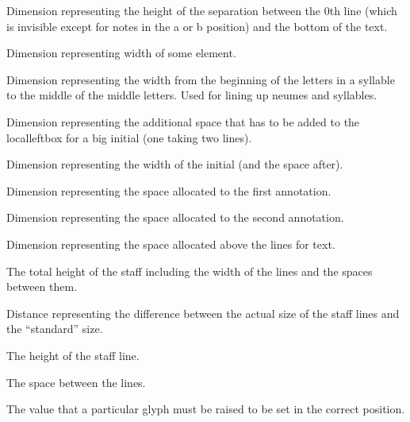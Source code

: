 Dimension representing the height of the separation between the 0th
line (which is invisible except for notes in the a or b position) and
the bottom of the text.

Dimension representing width of some element.

Dimension representing the width from the beginning of the letters in
a syllable to the middle of the middle letters.  Used for lining up
neumes and syllables.

Dimension representing the additional space that has to be added to
the localleftbox for a big initial (one taking two lines).

Dimension representing the width of the initial (and the space after).

Dimension representing the space allocated to the first annotation.

Dimension representing the space allocated to the second annotation.

Dimension representing the space allocated above the lines for text.	

The total height of the staff including the width of the lines and the spaces between them.

Distance representing the difference between the actual size of the staff lines and the ``standard'' size.

The height of the staff line.

The space between the lines.

The value that a particular glyph must be raised to be set in the correct position.

